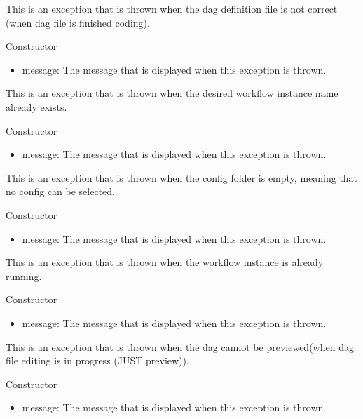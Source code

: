 This is an exception that is thrown when the dag definition file is not correct (when dag file is finished coding).
\begin{methodenv}{Constructor}

\begin{itemize}
    \item{message:}
    The message that is displayed when this exception is thrown.
\end{itemize}
\end{methodenv}


This is an exception that is thrown when the desired workflow instance name already exists.
\begin{methodenv}{Constructor}

\begin{itemize}
    \item{message:}
    The message that is displayed when this exception is thrown.
\end{itemize}
\end{methodenv}


This is an exception that is thrown when the config folder is empty, meaning that no config can be selected.
\begin{methodenv}{Constructor}

\begin{itemize}
    \item{message:}
    The message that is displayed when this exception is thrown.
\end{itemize}
\end{methodenv}


This is an exception that is thrown when the workflow instance is already running.
\begin{methodenv}{Constructor}

\begin{itemize}
    \item{message:}
    The message that is displayed when this exception is thrown.
\end{itemize}
\end{methodenv}

This is an exception that is thrown when the dag cannot be previewed(when dag file editing is in progress (JUST preview)).
\begin{methodenv}{Constructor}

\begin{itemize}
    \item{message:}
    The message that is displayed when this exception is thrown.
\end{itemize}
\end{methodenv}